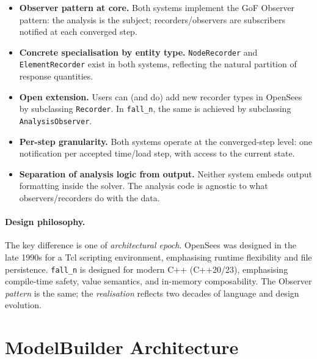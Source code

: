\begin{itemize}
  \item \textbf{Observer pattern at core.}  Both systems implement
        the GoF Observer pattern: the analysis is the subject;
        recorders/observers are subscribers notified at each
        converged step.

  \item \textbf{Concrete specialisation by entity type.}
        \texttt{NodeRecorder} and \texttt{ElementRecorder} exist in
        both systems, reflecting the natural partition of response
        quantities.

  \item \textbf{Open extension.}  Users can (and do) add new recorder
        types in OpenSees by subclassing \texttt{Recorder}.  In
        \texttt{fall\_n}, the same is achieved by subclassing
        \texttt{AnalysisObserver}.

  \item \textbf{Per-step granularity.}  Both systems operate at
        the converged-step level: one notification per accepted
        time/load step, with access to the current state.

  \item \textbf{Separation of analysis logic from output.}  Neither
        system embeds output formatting inside the solver.
        The analysis code is agnostic to what observers/recorders do
        with the data.
\end{itemize}

\paragraph{Design philosophy.}
The key difference is one of \emph{architectural epoch}.  OpenSees was
designed in the late 1990s for a Tcl scripting environment, emphasising
runtime flexibility and file persistence.  \texttt{fall\_n} is designed
for modern C++ (C++20/23), emphasising compile-time safety, value
semantics, and in-memory composability.  The Observer \emph{pattern}
is the same; the \emph{realisation} reflects two decades of language
and design evolution.


\section{ModelBuilder Architecture}
\label{sec:model-builder}

